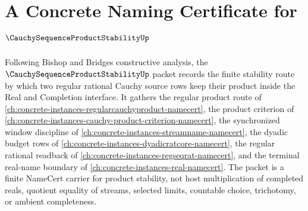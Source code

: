 \chapter{A Concrete Naming Certificate for $\CauchySequenceProductStabilityUp$}
\label{ch:concrete-instances-cauchy-sequence-product-stability-namecert}

Following Bishop and Bridges constructive analysis, the $\CauchySequenceProductStabilityUp$ packet records the finite stability route by which two regular rational Cauchy source rows keep their product inside the Real and Completion interface. It gathers the regular product route of \autoref{ch:concrete-instances-regularcauchyproduct-namecert}, the product criterion of \autoref{ch:concrete-instances-cauchy-product-criterion-namecert}, the synchronized window discipline of \autoref{ch:concrete-instances-streamname-namecert}, the dyadic budget rows of \autoref{ch:concrete-instances-dyadicratcore-namecert}, the regular rational readback of \autoref{ch:concrete-instances-regseqrat-namecert}, and the terminal real-name boundary of \autoref{ch:concrete-instances-real-namecert}. The packet is a finite NameCert carrier for product stability, not host multiplication of completed reals, quotient equality of streams, selected limits, countable choice, trichotomy, or ambient completeness.


